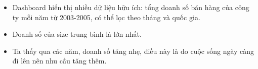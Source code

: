 \documentclass{article}
\begin{document}
\begin{itemize}

\item Dashboard hiển thị nhiều dữ liệu hữu ích: tổng doanh số bán hàng của công ty mỗi năm từ 2003-2005, có thể lọc theo tháng và quốc gia.
\item Doanh số của size trung bình là lớn nhất.
\item Ta thấy qua các năm, doanh số tăng nhẹ, điều này là do cuộc sống ngày càng đi lên nên nhu cầu tăng thêm.

\end{itemize}
\end{document}
